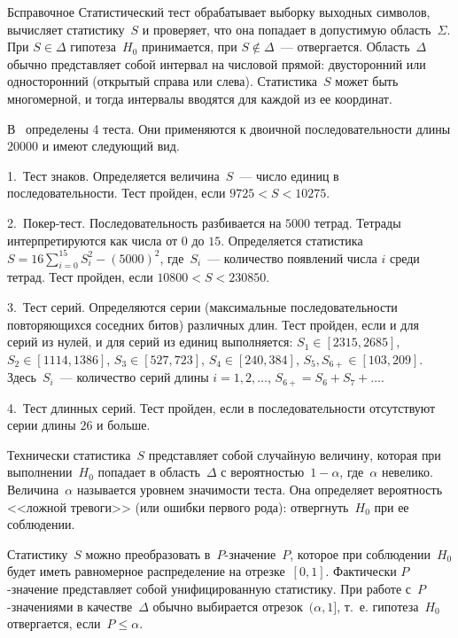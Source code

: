 \begin{appendix}{Б}{справочное}
Статистический тест обрабатывает выборку выходных символов, 
вычисляет статистику~$S$ и проверяет, что она попадает
в допустимую область~$\Sigma$. При $S\in\Delta$ гипотеза~$H_0$ принимается,
при $S\notin\Delta$~--- отвергается. Область~$\Delta$ обычно представляет
собой интервал на числовой прямой: двусторонний или односторонний 
(открытый справа или слева). Статистика~$S$ может быть многомерной,
и тогда интервалы вводятся для каждой из ее координат.

\begin{example}
В~\cite{FIPS140-2} определены 4 теста. Они применяются к двоичной 
последовательности длины $20000$ и имеют следующий вид.

1.~Тест знаков. Определяется величина~$S$~--- 
число единиц в последовательности. 
Тест пройден, если $9725<S<10275$.

2.~Покер-тест. Последовательность разбивается на $5000$ тетрад.
Тетрады интерпретируются как числа от $0$ до $15$.
Определяется статистика~$S=16\sum_{i=0}^{15}S_i^2-(5000)^2$,
где~$S_i$~--- количество появлений числа $i$ среди тетрад.
Тест пройден, если $10800<S<230850$.

3.~Тест серий. Определяются серии (максимальные последовательности 
повторяющихся соседних битов) различных длин. 
Тест пройден, если и для серий из нулей, и для серий из единиц выполняется: 
$S_1\in[2315,2685]$,
$S_2\in[1114,1386]$,
$S_3\in[527,723]$,
$S_4\in[240,384]$,
$S_5,S_{6+}\in[103,209]$.
Здесь~$S_i$~--- количество серий длины $i=1,2,\ldots$, 
$S_{6+}=S_6+S_7+\ldots$.

4.~Тест длинных серий. Тест пройден, если в последовательности отсутствуют 
серии длины $26$ и больше.
\end{example}

Технически статистика~$S$ представляет собой случайную величину, 
которая при выполнении~$H_0$ попадает в область~$\Delta$ 
с вероятностью~$1-\alpha$, где~$\alpha$ невелико.
%
Величина~$\alpha$ называется уровнем значимости теста. 
%
Она определяет вероятность <<ложной тревоги>> (или ошибки первого рода): 
отвергнуть~$H_0$ при ее соблюдении.

Статистику~$S$ можно преобразовать в~$P$-значение~$P$, 
которое при соблюдении~$H_0$ будет иметь равномерное распределение на 
отрезке~$[0,1]$. Фактически $P$-значение представляет собой унифицированную 
статистику. При работе с~$P$-значениями в качестве~$\Delta$ обычно выбирается
отрезок~$(\alpha,1]$, т.~е. гипотеза~$H_0$ отвергается, если~$P\leq\alpha$.


\end{appendix}
